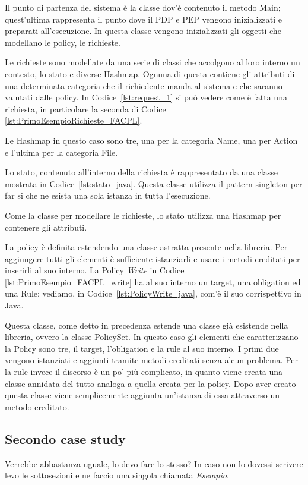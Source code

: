 Il punto di partenza del sistema è la classe dov'è contenuto il metodo Main; quest'ultima rappresenta il punto dove il \ac{PDP} e \ac{PEP} vengono inizializzati e preparati all'esecuzione. In questa classe vengono inizializzati gli oggetti che modellano le policy, le richieste. \par
Le richieste sono modellate da una serie di classi che accolgono al loro interno un contesto, lo stato e diverse Hashmap. Ognuna di questa contiene gli attributi di una determinata categoria che il richiedente manda al sistema e che saranno valutati dalle policy. In Codice~\ref{lst:request_1} si può vedere come è fatta una richiesta, in particolare la seconda di Codice \ref{lst:PrimoEsempioRichieste_FACPL}.

Le Hashmap in questo caso sono tre, una per la categoria Name, una per Action e l'ultima per la categoria File. \par
Lo stato, contenuto all'interno della richiesta è rappresentato da una classe mostrata in Codice~\ref{lst:stato_java}. Questa classe utilizza il pattern singleton per far si che ne esista una sola istanza in tutta l'esecuzione. 

Come la classe per modellare le richieste, lo stato utilizza una Hashmap per contenere gli attributi.\par
La policy è definita estendendo una classe astratta presente nella libreria. Per aggiungere tutti gli elementi è sufficiente istanziarli e usare i metodi ereditati per inserirli al suo interno.
La Policy \textit{Write} in Codice \ref{lst:PrimoEsempio_FACPL_write} ha al suo interno un target, una obligation ed una Rule; vediamo, in Codice~\ref{lst:PolicyWrite_java}, com'è il suo corrispettivo in Java.

Questa classe, come detto in precedenza estende una classe già esistende nella libreria, ovvero la classe PolicySet. In questo caso gli elementi che caratterizzano la Policy sono tre, il target, l'obligation e la rule al suo interno. I primi due vengono istanziati e aggiunti tramite metodi ereditati senza alcun problema. Per la rule invece il discorso è un po' più complicato, in quanto viene creata una classe annidata del tutto analoga a quella creata per la policy. Dopo aver creato questa classe viene semplicemente aggiunta un'istanza di essa attraverso un metodo ereditato.



\subsection{Secondo case study}

Verrebbe abbastanza uguale, lo devo fare lo stesso? In caso non lo dovessi scrivere levo le sottosezioni e ne faccio una singola chiamata \textit{Esempio}.